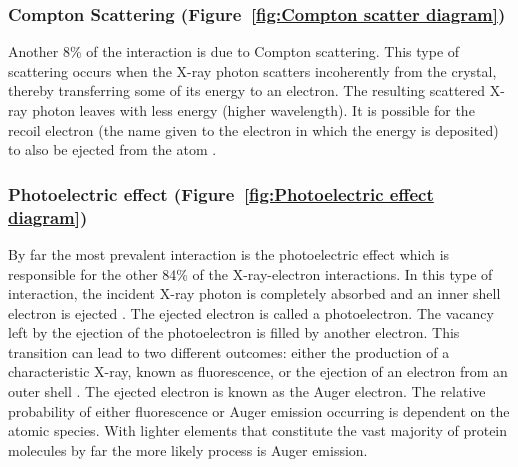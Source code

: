         \subsubsection{Compton Scattering (Figure~\ref{fig:Compton scatter diagram})}
        \label{subs:Compton Scattering}
            Another 8\% of the interaction is due to Compton scattering.
            This type of scattering occurs when the X-ray photon scatters incoherently from the crystal, thereby transferring some of its energy to an electron.
            The resulting scattered X-ray photon leaves with less energy (higher wavelength).
            It is possible for the recoil electron (the name given to the electron in which the energy is deposited) to also be ejected from the atom \cite{nave1995}.

        \subsubsection{Photoelectric effect (Figure~\ref{fig:Photoelectric effect diagram})}
        \label{subs:Photoelectric effect}
            By far the most prevalent interaction is the photoelectric effect which is responsible for the other 84\% of the X-ray-electron interactions.
            In this type of interaction, the incident X-ray photon is completely absorbed and an inner shell electron is ejected \cite{garman2010}.
            The ejected electron is called a photoelectron.
            The vacancy left by the ejection of the photoelectron is filled by another electron.
            This transition can lead to two different outcomes: either the production of a characteristic X-ray, known as fluorescence, or the ejection of an electron from an outer shell \cite{nave1995}.
            The ejected electron is known as the Auger electron.
            The relative probability of either fluorescence or Auger emission occurring is dependent on the atomic species.
            With lighter elements that constitute the vast majority of protein molecules by far the more likely process is Auger emission.

